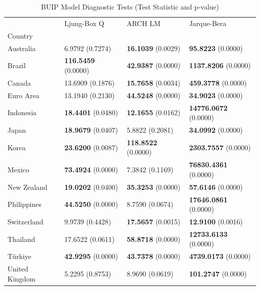 \documentclass[a4paper,10pt,final]{article}    %
\begin{document}
\begin{table}
    \caption{BUIP Model Diagnostic Tests (Test Statistic and p-value)}
    \label{tab:buip_diagnostics}
    {\centering
    \begin{tabular}{llll}
        \toprule
                       & Ljung-Box Q                & ARCH LM                    & Jarque-Bera                  \\
        Country        &                            &                            &                              \\
        \midrule
        Australia      & 6.9792 (0.7274)            & \textbf{16.1039} (0.0029)  & \textbf{95.8223} (0.0000)    \\
        Brazil         & \textbf{116.5459} (0.0000) & \textbf{42.9387} (0.0000)  & \textbf{1137.8206} (0.0000)  \\
        Canada         & 13.6909 (0.1876)           & \textbf{15.7658} (0.0034)  & \textbf{459.3778} (0.0000)   \\
        Euro Area      & 13.1940 (0.2130)           & \textbf{44.5248} (0.0000)  & \textbf{34.9023} (0.0000)    \\
        Indonesia      & \textbf{18.4401} (0.0480)  & \textbf{12.1655} (0.0162)  & \textbf{14776.0672} (0.0000) \\
        Japan          & \textbf{18.9679} (0.0407)  & 5.8822 (0.2081)            & \textbf{34.0992} (0.0000)    \\
        Korea          & \textbf{23.6200} (0.0087)  & \textbf{118.8522} (0.0000) & \textbf{2303.7557} (0.0000)  \\
        Mexico         & \textbf{73.4924} (0.0000)  & 7.3842 (0.1169)            & \textbf{76830.4361} (0.0000) \\
        New Zealand    & \textbf{19.0202} (0.0400)  & \textbf{35.3253} (0.0000)  & \textbf{57.6146} (0.0000)    \\
        Philippines    & \textbf{44.5250} (0.0000)  & 8.7590 (0.0674)            & \textbf{17646.0861} (0.0000) \\
        Switzerland    & 9.9739 (0.4428)            & \textbf{17.5657} (0.0015)  & \textbf{12.9100} (0.0016)    \\
        Thailand       & 17.6522 (0.0611)           & \textbf{58.8718} (0.0000)  & \textbf{12733.6133} (0.0000) \\
        Türkiye        & \textbf{42.9295} (0.0000)  & \textbf{43.7378} (0.0000)  & \textbf{4739.0173} (0.0000)  \\
        United Kingdom & 5.2295 (0.8753)            & 8.9690 (0.0619)            & \textbf{101.2747} (0.0000)   \\
        \bottomrule
    \end{tabular}}
\end{table}
\end{document}
